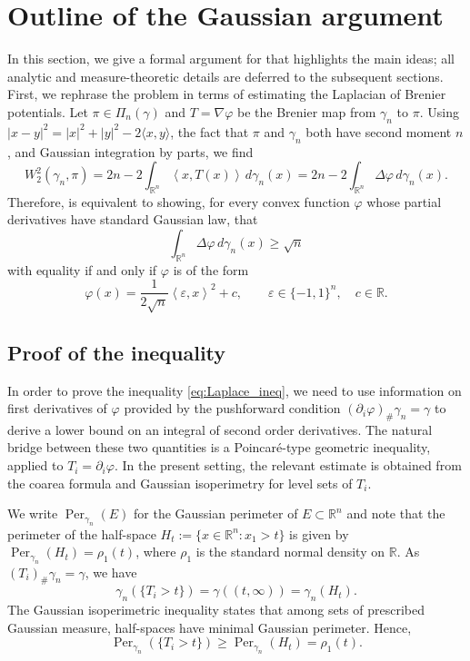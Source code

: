 \documentclass[11pt]{amsart}
\theoremstyle{definition}
\newcommand{\R}{\mathbb{R}}
\newcommand{\W}{W}
\newcommand{\ip}[2]{\left\langle #1,#2\right\rangle}
\newcommand{\Perg}{\operatorname{Per}_{\gamma_n}}
\begin{document}
\section{Outline of the Gaussian argument}
\label{sec:formal}
In this section, we give a formal argument for  that highlights the main ideas; all analytic and measure-theoretic details are deferred to the subsequent sections. First, we rephrase the problem in terms of estimating the Laplacian of Brenier potentials. Let $\pi\in\Pi_n(\gamma)$ and $T=\nabla\varphi$ be the Brenier map from $\gamma_n$ to $\pi$. Using $|x-y|^2=|x|^2+|y|^2-2\langle x,y\rangle$, the fact that $\pi$ and $\gamma_n$ both have second moment $n$, and Gaussian integration by parts, we find
\begin{equation}\label{eq:formal-cost}
  \W_2^2(\gamma_n,\pi)
  =2n-2\int_{\R^n}\ip{x}{T(x)}\,d\gamma_n(x) = 2n-2\int_{\R^n}\Delta\varphi\,d\gamma_n(x).
\end{equation}
Therefore,  is equivalent to showing, for every convex function $\varphi$ whose partial derivatives have standard Gaussian law, that
\begin{equation}\label{eq:Laplace_ineq}
\int_{\R^n}\Delta\varphi\,d\gamma_n(x) \ge \sqrt n    
\end{equation}
with equality if and only if $\varphi$ is of the form
\begin{equation}
  \varphi(x)
  =\frac{1}{2\sqrt n}\ip{\varepsilon}{x}^2+c,
  \qquad
  \varepsilon\in\{-1,1\}^n,
  \quad c\in\R.
\end{equation}

\subsection{Proof of the inequality}
In order to prove the inequality \eqref{eq:Laplace_ineq}, we need to use information on first derivatives of $\varphi$ provided by the pushforward condition $(\partial_i\varphi)_\#\gamma_n=\gamma$ to derive a lower bound on an integral of second order derivatives. The natural bridge between these two quantities is a Poincaré-type geometric inequality, applied to $T_i = \partial_i\varphi$. In the present setting, the relevant estimate is obtained from the coarea formula and Gaussian isoperimetry for level sets of $T_i$.

\medskip
We write $\Perg(E)$ for the Gaussian perimeter of $E \subset \R^n$ and note that the perimeter of the half-space $H_t:=\{x\in\R^n:x_1>t\}$ is given by $\Perg(H_t)=\rho_1(t)$, where $\rho_1$ is the standard normal density on $\R$. As $(T_i)_\#\gamma_n=\gamma$, we have
\[
    \gamma_n(\{T_i>t\})
    =
    \gamma((t,\infty))
    =
    \gamma_n(H_t).
\]
The Gaussian isoperimetric inequality states that among sets of prescribed Gaussian measure, half-spaces have minimal Gaussian perimeter. Hence,
\begin{equation}\label{eq:level-set-perimeter}
    \Perg(\{T_i>t\})
    \geq
    \Perg(H_t)
    =
    \rho_1(t).
\end{equation}
\end{document}
